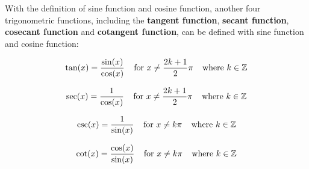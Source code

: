\documentclass[a4paper,12pt]{article}
\begin{document}
\begin{dft}
  With the definition of sine function and cosine function, another four trigonometric functions, including the \textbf{tangent function}, \textbf{secant function}, \textbf{cosecant function} and \textbf{cotangent function}, can be defined with sine function and cosine function:

  $$\tan(x)=\frac{\sin(x)}{\cos(x)}\;\;\;\;\text{for }x\neq\frac{2k+1}{2}\pi\;\;\;\;\text{where }k\in\mathbb{Z}$$\s

  $$\sec(x)=\frac{1}{\cos(x)}\;\;\;\;\text{for }x\neq\frac{2k+1}{2}\pi\;\;\;\;\text{where }k\in\mathbb{Z}$$\s

  $$\csc(x)=\frac{1}{\sin(x)}\;\;\;\;\text{for }x\neq k\pi\;\;\;\;\text{where }k\in\mathbb{Z}$$\s

  $$\cot(x)=\frac{\cos(x)}{\sin(x)}\;\;\;\;\text{for }x\neq k\pi\;\;\;\;\text{where }k\in\mathbb{Z}$$
\end{dft}
\end{document}
